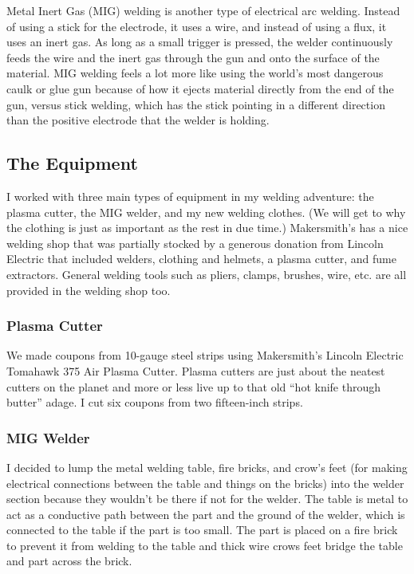 \documentclass{article}
\begin{document}
Metal Inert Gas (MIG) welding is another type of electrical arc welding. Instead of using a stick for the electrode, it uses a wire, and instead of using a flux, it uses an inert gas. As long as a small trigger is pressed, the welder continuously feeds the wire and the inert gas through the gun and onto the surface of the material. MIG welding feels a lot more like using the world's most dangerous caulk or glue gun because of how it ejects material directly from the end of the gun, versus stick welding, which has the stick pointing in a different direction than the positive electrode that the welder is holding.

\subsection*{The Equipment}

I worked with three main types of equipment in my welding adventure: the plasma cutter, the MIG welder, and my new welding clothes. (We will get to why the clothing is just as important as the rest in due time.) Makersmith's has a nice welding shop that was partially stocked by a generous donation from Lincoln Electric that included welders, clothing and helmets, a plasma cutter, and fume extractors. General welding tools such as pliers, clamps, brushes, wire, etc. are all provided in the welding shop too.

\subsubsection*{Plasma Cutter}

We made coupons from 10-gauge steel strips using Makersmith's Lincoln Electric Tomahawk 375 Air Plasma Cutter. Plasma cutters are just about the neatest cutters on the planet and more or less live up to that old ``hot knife through butter'' adage. I cut six coupons from two fifteen-inch strips.

\subsubsection*{MIG Welder}

I decided to lump the metal welding table, fire bricks, and crow's feet (for making electrical connections between the table and things on the bricks) into the welder section because they wouldn't be there if not for the welder. The table is metal to act as a conductive path between the part and the ground of the welder, which is connected to the table if the part is too small. The part is placed on a fire brick to prevent it from welding to the table and thick wire crows feet bridge the table and part across the brick.
\end{document}
